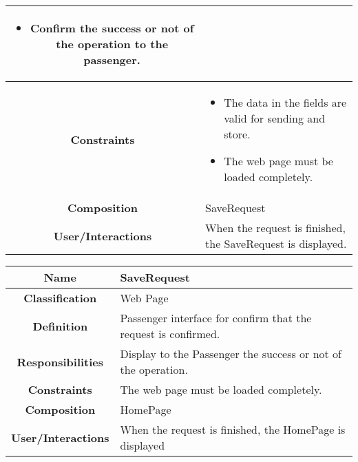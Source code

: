 \documentclass[11pt, a4paper,titlepage]{article}
\begin{document}
\begin{enumerate}
\begin{tabularx}{\textwidth}{| c | X |}
\begin{itemize}
		\item Confirm the success or not of the operation to the passenger.
	\end{itemize}
	\\
	\hline
	\textbf{Constraints} & 
	\begin{itemize}
		\item  The data in the fields are valid for sending and store.
		\item The web page must be loaded completely.
	\end{itemize}
	\\
	\hline
	\textbf{Composition} & 
	SaveRequest
	\\
	\hline
	\textbf{User/Interactions} & 
    When the request is finished, the SaveRequest is displayed.
	\\
	\hline	
\end{tabularx}

\begin{tabularx}{\textwidth}{| c | X |}
	\hline
	\textbf{Name} & 
	SaveRequest
	\\
	\hline
	\textbf{Classification} & 
	Web Page
	\\
	\hline
	\textbf{Definition} & 
	Passenger interface for confirm that the request is confirmed.
	\\
	\hline
	\textbf{Responsibilities} &
	Display to the Passenger the success or not of the operation.
	\\
	\hline
	\textbf{Constraints} & 
		 The web page must be loaded completely.
	\\
	\hline
	\textbf{Composition} & 
	HomePage
	\\
	\hline
	\textbf{User/Interactions} & 
	When the request is finished, the HomePage is displayed
	\\
	\hline	
\end{tabularx}


\end{enumerate}
\end{document}
